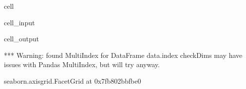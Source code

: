 \documentclass[letterpaper,table,10pt,english]{jupyterBook}
\begin{document}
\begin{sphinxuseclass}{cell}\begin{sphinxVerbatimInput}

\begin{sphinxuseclass}{cell_input}
\begin{sphinxVerbatim}[commandchars=\\\{\}]
  
     
                 
                     
\end{sphinxVerbatim}

\end{sphinxuseclass}\end{sphinxVerbatimInput}
\begin{sphinxVerbatimOutput}

\begin{sphinxuseclass}{cell_output}
\begin{sphinxVerbatim}[commandchars=\\\{\}]
*** Warning: found MultiIndex for DataFrame data.index \PYGZhy{} checkDims may have issues with Pandas MultiIndex, but will try anyway.
\end{sphinxVerbatim}

\begin{sphinxVerbatim}[commandchars=\\\{\}]
\PYGZlt{}seaborn.axisgrid.FacetGrid at 0x7fb802bbfbe0\PYGZgt{}
\end{sphinxVerbatim}

\noindent{}

\end{sphinxuseclass}\end{sphinxVerbatimOutput}

\end{sphinxuseclass}
\end{document}
